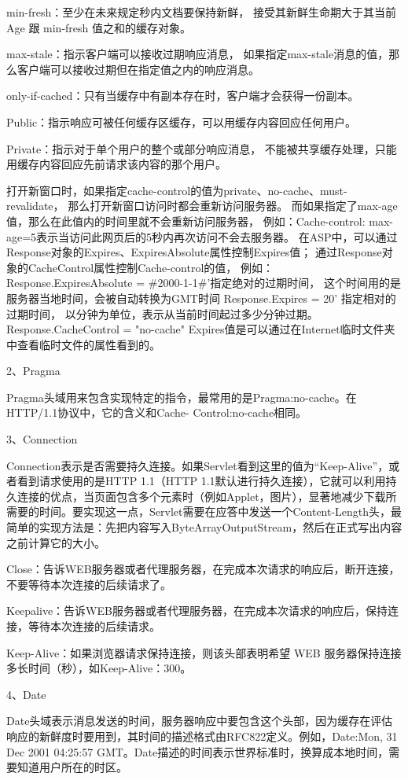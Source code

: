 \documentclass{book}
\begin{document}
min-fresh：至少在未来规定秒内文档要保持新鲜，
接受其新鲜生命期大于其当前 Age 跟 min-fresh 值之和的缓存对象。

max-stale：指示客户端可以接收过期响应消息，
如果指定max-stale消息的值，那么客户端可以接收过期但在指定值之内的响应消息。

only-if-cached：只有当缓存中有副本存在时，客户端才会获得一份副本。

Public：指示响应可被任何缓存区缓存，可以用缓存内容回应任何用户。

Private：指示对于单个用户的整个或部分响应消息，
不能被共享缓存处理，只能用缓存内容回应先前请求该内容的那个用户。

打开新窗口时，如果指定cache-control的值为private、no-cache、must-revalidate，
那么打开新窗口访问时都会重新访问服务器。
而如果指定了max-age值，那么在此值内的时间里就不会重新访问服务器，
例如：Cache-control: max-age=5表示当访问此网页后的5秒内再次访问不会去服务器。
在ASP中，可以通过Response对象的Expires、ExpiresAbsolute属性控制Expires值；
通过Response对象的CacheControl属性控制Cache-control的值，
例如：
Response.ExpiresAbsolute = \#2000-1-1\#'指定绝对的过期时间，
这个时间用的是服务器当地时间，会被自动转换为GMT时间
Response.Expires = 20' 指定相对的过期时间，
以分钟为单位，表示从当前时间起过多少分钟过期。
Response.CacheControl = "no-cache"
Expires值是可以通过在Internet临时文件夹中查看临时文件的属性看到的。

2、Pragma

Pragma头域用来包含实现特定的指令，最常用的是Pragma:no-cache。在HTTP/1.1协议中，它的含义和Cache- Control:no-cache相同。

3、Connection

Connection表示是否需要持久连接。如果Servlet看到这里的值为“Keep-Alive”，或者看到请求使用的是HTTP 1.1（HTTP 1.1默认进行持久连接），它就可以利用持久连接的优点，当页面包含多个元素时（例如Applet，图片），显著地减少下载所需要的时间。要实现这一点，Servlet需要在应答中发送一个Content-Length头，最简单的实现方法是：先把内容写入ByteArrayOutputStream，然后在正式写出内容之前计算它的大小。

Close：告诉WEB服务器或者代理服务器，在完成本次请求的响应后，断开连接，不要等待本次连接的后续请求了。

Keepalive：告诉WEB服务器或者代理服务器，在完成本次请求的响应后，保持连接，等待本次连接的后续请求。

Keep-Alive：如果浏览器请求保持连接，则该头部表明希望 WEB 服务器保持连接多长时间（秒），如Keep-Alive：300。

4、Date

Date头域表示消息发送的时间，服务器响应中要包含这个头部，因为缓存在评估响应的新鲜度时要用到，其时间的描述格式由RFC822定义。例如，Date:Mon, 31 Dec 2001 04:25:57 GMT。Date描述的时间表示世界标准时，换算成本地时间，需要知道用户所在的时区。
\end{document}

